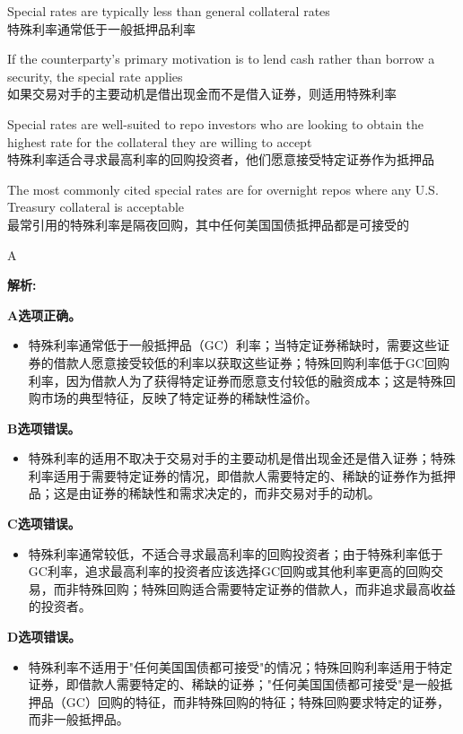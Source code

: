 \documentclass{article}
\newenvironment{explanation}
{\textbf{解析:}\par}
{\par}
\begin{document}
\begin{choices}
    \item Special rates are typically less than general collateral rates\\
    特殊利率通常低于一般抵押品利率
    \item If the counterparty's primary motivation is to lend cash rather than borrow a security, the special rate applies\\
    如果交易对手的主要动机是借出现金而不是借入证券，则适用特殊利率
    \item Special rates are well-suited to repo investors who are looking to obtain the highest rate for the collateral they are willing to accept\\
    特殊利率适合寻求最高利率的回购投资者，他们愿意接受特定证券作为抵押品
    \item The most commonly cited special rates are for overnight repos where any U.S. Treasury collateral is acceptable\\
    最常引用的特殊利率是隔夜回购，其中任何美国国债抵押品都是可接受的
\end{choices}

\begin{correctanswer}
    A
\end{correctanswer}

\begin{explanation}
    \textbf{A选项正确。}
    \begin{itemize}
        \item 特殊利率通常低于一般抵押品（GC）利率；当特定证券稀缺时，需要这些证券的借款人愿意接受较低的利率以获取这些证券；特殊回购利率低于GC回购利率，因为借款人为了获得特定证券而愿意支付较低的融资成本；这是特殊回购市场的典型特征，反映了特定证券的稀缺性溢价。
    \end{itemize}

    \textbf{B选项错误。}
    \begin{itemize}
        \item 特殊利率的适用不取决于交易对手的主要动机是借出现金还是借入证券；特殊利率适用于需要特定证券的情况，即借款人需要特定的、稀缺的证券作为抵押品；这是由证券的稀缺性和需求决定的，而非交易对手的动机。
    \end{itemize}

    \textbf{C选项错误。}
    \begin{itemize}
        \item 特殊利率通常较低，不适合寻求最高利率的回购投资者；由于特殊利率低于GC利率，追求最高利率的投资者应该选择GC回购或其他利率更高的回购交易，而非特殊回购；特殊回购适合需要特定证券的借款人，而非追求最高收益的投资者。
    \end{itemize}

    \textbf{D选项错误。}
    \begin{itemize}
        \item 特殊利率不适用于"任何美国国债都可接受"的情况；特殊回购利率适用于特定证券，即借款人需要特定的、稀缺的证券；"任何美国国债都可接受"是一般抵押品（GC）回购的特征，而非特殊回购的特征；特殊回购要求特定的证券，而非一般抵押品。
    \end{itemize}
\end{explanation}
\end{document}
